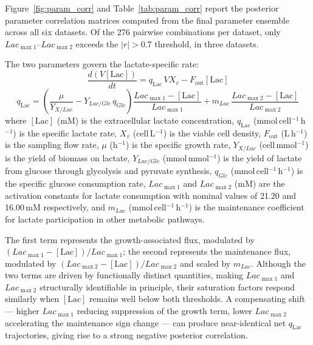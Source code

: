 \label{SI:param_corr}
Figure~\ref{fig:param_corr} and Table~\ref{tab:param_corr} report the posterior parameter correlation matrices computed from the final parameter ensemble across all six datasets. Of the 276 pairwise combinations per dataset, only $Lac_{\max1}$--$Lac_{\max2}$ exceeds the $|r|>0.7$ threshold, in three datasets.

The two parameters govern the lactate-specific rate:
\begin{equation}
    \frac{d(V[\mathrm{Lac}])}{dt} = q_{\mathrm{Lac}}\,V X_v - F_{\mathrm{out}}[\mathrm{Lac}]
\end{equation}
\begin{equation}
    q_{\mathrm{Lac}} = \left(\frac{\mu}{Y_{X/Lac}} - Y_{Lac/Glc}\,q_{Glc}\right)\frac{Lac_{\max1} - [\mathrm{Lac}]}{Lac_{\max1}} + m_{Lac}\,\frac{Lac_{\max2} - [\mathrm{Lac}]}{Lac_{\max2}}
\end{equation}
\noindent where $[\mathrm{Lac}]$ (mM) is the extracellular lactate concentration, $q_{\mathrm{Lac}}$ (mmol\,cell$^{-1}$\,h$^{-1}$) is the specific lactate rate, $X_v$ (cell\,L$^{-1}$) is the viable cell density, $F_{\mathrm{out}}$ (L\,h$^{-1}$) is the sampling flow rate, $\mu$ (h$^{-1}$) is the specific growth rate, $Y_{X/Lac}$ (cell\,mmol$^{-1}$) is the yield of biomass on lactate, $Y_{Lac/Glc}$ (mmol\,mmol$^{-1}$) is the yield of lactate from glucose through glycolysis and pyruvate synthesis, $q_{Glc}$ (mmol\,cell$^{-1}$\,h$^{-1}$) is the specific glucose consumption rate, $Lac_{\max1}$ and $Lac_{\max2}$ (mM) are the activation constants for lactate consumption with nominal values of 21.20 and 16.00\,mM respectively, and $m_{Lac}$ (mmol\,cell$^{-1}$\,h$^{-1}$) is the maintenance coefficient for lactate participation in other metabolic pathways.

The first term represents the growth-associated flux, modulated by $(Lac_{\max1} - [\mathrm{Lac}])/Lac_{\max1}$; the second represents the maintenance flux, modulated by $(Lac_{\max2} - [\mathrm{Lac}])/Lac_{\max2}$ and scaled by $m_{Lac}$. Although the two terms are driven by functionally distinct quantities, making $Lac_{\max1}$ and $Lac_{\max2}$ structurally identifiable in principle, their saturation factors respond similarly when $[\mathrm{Lac}]$ remains well below both thresholds. A compensating shift — higher $Lac_{\max1}$ reducing suppression of the growth term, lower $Lac_{\max2}$ accelerating the maintenance sign change — can produce near-identical net $q_{\mathrm{Lac}}$ trajectories, giving rise to a strong negative posterior correlation.

